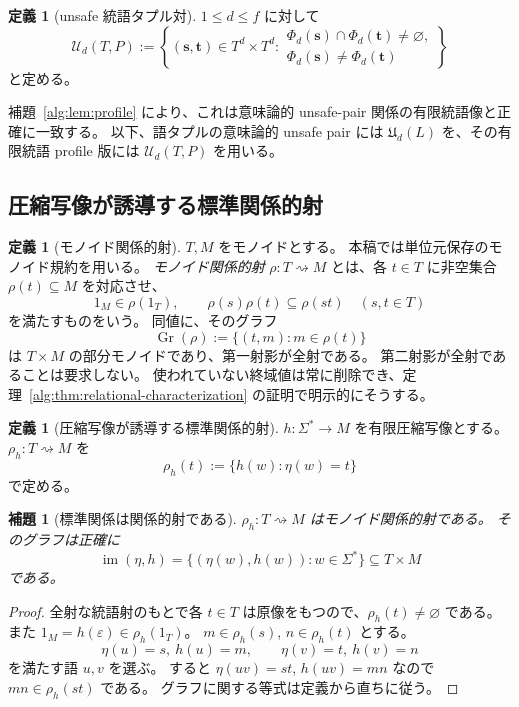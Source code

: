 \documentclass[10pt,a4paper]{ltjsarticle}
\newtheorem{lemma}[theorem]{補題}
\theoremstyle{definition}
\newtheorem{definition}[theorem]{定義}
\theoremstyle{remark}
\newcommand{\relto}{\mathrel{\rightsquigarrow}}
\begin{document}
\begin{definition}[unsafe 統語タプル対]
$1\le d\le f$ に対して
\[
\mathcal U_d(T,P)
:=
\left\{
(\mathbf s,\mathbf t)\in T^d\times T^d:
\begin{array}{l}
\Phi_d(\mathbf s)\cap\Phi_d(\mathbf t)\neq\varnothing,\\
\Phi_d(\mathbf s)\neq\Phi_d(\mathbf t)
\end{array}
\right\}
\]
と定める。
\end{definition}

補題~\ref{alg:lem:profile} により、これは意味論的 unsafe-pair 関係の有限統語像と正確に一致する。
以下、語タプルの意味論的 unsafe pair には $\mathfrak U_d(L)$ を、その有限統語 profile 版には $\mathcal U_d(T,P)$ を用いる。

\subsection{圧縮写像が誘導する標準関係的射}

\begin{definition}[モノイド関係的射]
$T,M$ をモノイドとする。
本稿では単位元保存のモノイド規約を用いる。
\emph{モノイド関係的射}
$\rho:T\relto M$
とは、各 $t\in T$ に非空集合 $\rho(t)\subseteq M$ を対応させ、
\[
1_M\in\rho(1_T),
\qquad
\rho(s)\rho(t)\subseteq\rho(st)
\quad(s,t\in T)
\]
を満たすものをいう。
同値に、そのグラフ
\[
\operatorname{Gr}(\rho)
:=\{(t,m):m\in\rho(t)\}
\]
は $T\times M$ の部分モノイドであり、第一射影が全射である。
第二射影が全射であることは要求しない。
使われていない終域値は常に削除でき、定理~\ref{alg:thm:relational-characterization} の証明で明示的にそうする。
\end{definition}

\begin{definition}[圧縮写像が誘導する標準関係的射]
$h:\Sigma^*\to M$ を有限圧縮写像とする。
$\rho_h:T\relto M$ を
\[
\rho_h(t):=\{h(w):\eta(w)=t\}
\]
で定める。
\end{definition}

\begin{lemma}[標準関係は関係的射である]
\label{alg:lem:canonical-rel}
$\rho_h:T\relto M$ はモノイド関係的射である。
そのグラフは正確に
\[
\operatorname{im}(\eta,h)
=
\{(\eta(w),h(w)):w\in\Sigma^*\}
\subseteq T\times M
\]
である。
\end{lemma}

\begin{proof}
全射な統語射のもとで各 $t\in T$ は原像をもつので、$\rho_h(t)\neq\varnothing$ である。
また
$1_M=h(\varepsilon)\in\rho_h(1_T)$。
$m\in\rho_h(s)$, $n\in\rho_h(t)$ とする。
\[
\eta(u)=s,\ h(u)=m,
\qquad
\eta(v)=t,\ h(v)=n
\]
を満たす語 $u,v$ を選ぶ。
すると
$\eta(uv)=st$, $h(uv)=mn$
なので $mn\in\rho_h(st)$ である。
グラフに関する等式は定義から直ちに従う。
\end{proof}
\end{document}
